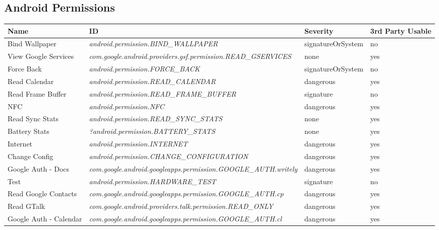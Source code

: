\chapter{}
\section{Android Permissions}

\begin{small}
\begin{longtable}{p{3cm}|p{8cm}|p{2.5cm}|p{1.5cm}}
Name & ID & Severity &3rd Party Usable \\
\hline

Bind Wallpaper & \textit{android.permission.\-BIND\_WALLPAPER} & signatureOrSystem & no \\
View Google Services & \textit{com.google.android.providers.gsf.permission.\-READ\_GSERVICES} & none & yes \\
Force Back & \textit{android.permission.\-FORCE\_BACK} & signatureOrSystem & no \\
Read Calendar & \textit{android.permission.\-READ\_CALENDAR} & dangerous & yes \\
Read Frame Buffer & \textit{android.permission.\-READ\_FRAME\_BUFFER} & signature & no \\
NFC & \textit{android.permission.\-NFC} & dangerous & yes \\
Read Sync Stats & \textit{android.permission.\-READ\_SYNC\_STATS} & none & yes \\
Battery Stats & \textit{?android.permission.\-BATTERY\_STATS} & none & yes \\
Internet & \textit{android.permission.\-INTERNET} & dangerous & yes \\
Change Config & \textit{android.permission.\-CHANGE\_CONFIGURATION} & dangerous & yes \\
Google Auth - Docs & \textit{com.google.android.googleapps.permission.\-GOOGLE\_AUTH.writely} & dangerous & yes \\
Test & \textit{android.permission.\-HARDWARE\_TEST} & signature & no \\
Read Google Contacts & \textit{com.google.android.googleapps.permission.\-GOOGLE\_AUTH.cp} & dangerous & yes \\
Read GTalk & \textit{com.google.android.providers.talk.permission.\-READ\_ONLY} & dangerous & yes \\
Google Auth - Calendar & \textit{com.google.android.googleapps.permission.\-GOOGLE\_AUTH.cl} & dangerous & yes \\

\end{longtable}
\end{small}
